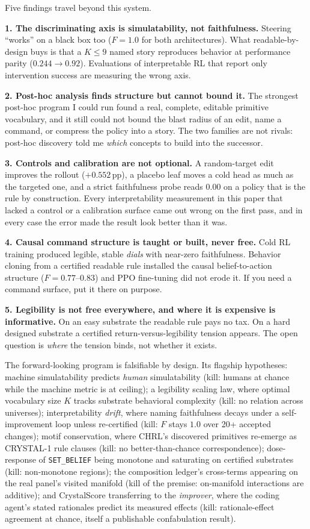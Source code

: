 \documentclass[11pt]{article}
\begin{document}
Five findings travel beyond this system.

\textbf{1. The discriminating axis is simulatability, not faithfulness.} Steering ``works'' on
a black box too ($F{=}1.0$ for both architectures). What readable-by-design buys is that a
$K{\le}9$ named story reproduces behavior at performance parity ($0.244 \to 0.92$). Evaluations
of interpretable RL that report only intervention success are measuring the wrong axis.

\textbf{2. Post-hoc analysis finds structure but cannot bound it.} The strongest post-hoc
program I could run found a real, complete, editable primitive vocabulary, and it still could
not bound the blast radius of an edit, name a command, or compress the policy into a story.
The two families are not rivals: post-hoc discovery told me \emph{which} concepts to build into
the successor.

\textbf{3. Controls and calibration are not optional.} A random-target edit improves the
rollout ($+0.552$\,pp), a placebo leaf moves a cold head as much as the targeted one, and a
strict faithfulness probe reads $0.00$ on a policy that is the rule by construction. Every
interpretability measurement in this paper that lacked a control or a calibration surface came
out wrong on the first pass, and in every case the error made the result look better than it
was.

\textbf{4. Causal command structure is taught or built, never free.} Cold RL training produced
legible, stable \emph{dials} with near-zero faithfulness. Behavior cloning from a certified
readable rule installed the causal belief-to-action structure ($F = 0.77$--$0.83$) and PPO
fine-tuning did not erode it. If you need a command surface, put it there on purpose.

\textbf{5. Legibility is not free everywhere, and where it is expensive is informative.} On
an easy substrate the readable rule pays no tax. On a hard designed substrate a certified
return-versus-legibility tension appears. The open question is \emph{where} the tension binds, not whether it exists.

The forward-looking program is falsifiable by design. Its flagship hypotheses: machine
simulatability predicts \emph{human} simulatability (kill: humans at chance while the machine
metric is at ceiling); a legibility scaling law, where optimal vocabulary size $K$ tracks
substrate behavioral complexity (kill: no relation across universes); interpretability
\emph{drift}, where naming faithfulness decays under a self-improvement loop unless re-certified
(kill: $F$ stays $1.0$ over 20+ accepted changes); motif conservation, where CHRL's discovered
primitives re-emerge as CRYSTAL-1 rule clauses (kill: no better-than-chance correspondence);
dose-response of \texttt{SET\_BELIEF} being monotone and saturating on certified substrates
(kill: non-monotone regions); the composition ledger's cross-terms appearing on the real panel's
visited manifold (kill of the premise: on-manifold interactions are additive); and CrystalScore
transferring to the \emph{improver}, where the coding agent's stated rationales predict its
measured effects (kill: rationale-effect agreement at chance, itself a publishable confabulation
result).
\end{document}

